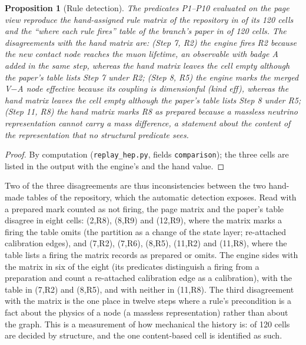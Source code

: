 \documentclass[11pt,a4paper,twoside,openany]{report}
\theoremstyle{plain}
\newtheorem{proposition}[theorem]{Proposition}
\theoremstyle{definition}
\theoremstyle{remark}
\begin{document}
\begin{proposition}[Rule detection]\label{prop:detection}
The predicates P1--P10 evaluated on the page view reproduce the hand-assigned rule matrix of the repository in \NhepAgree{} of its 120 cells and the ``where each rule fires'' table of the branch's paper in \NhepPaperAgree{} of 120 cells. The \NhepDisagree{} disagreements with the hand matrix are: (Step 7, R2) the engine fires R2 because the new contact node reaches the muon lifetime, an observable with badge A added in the same step, whereas the hand matrix leaves the cell empty although the paper's table lists Step 7 under R2; (Step 8, R5) the engine marks the merged V$-$A node effective because its coupling is dimensionful (kind \emph{eff}), whereas the hand matrix leaves the cell empty although the paper's table lists Step 8 under R5; (Step 11, R8) the hand matrix marks R8 as prepared because a massless neutrino representation cannot carry a mass difference, a statement about the content of the representation that no structural predicate sees.
\end{proposition}
\begin{proof}
By computation (\texttt{replay\_hep.py}, fields \texttt{comparison}); the three cells are listed in the output with the engine's and the hand value.
\end{proof}
Two of the three disagreements are thus inconsistencies between the two hand-made tables of the repository, which the automatic detection exposes. Read with a prepared mark counted as not firing, the page matrix and the paper's table disagree in eight cells: (2,R8), (8,R9) and (12,R9), where the matrix marks a firing the table omits (the partition as a change of the state layer; re-attached calibration edges), and (7,R2), (7,R6), (8,R5), (11,R2) and (11,R8), where the table lists a firing the matrix records as prepared or omits. The engine sides with the matrix in six of the eight (its predicates distinguish a firing from a preparation and count a re-attached calibration edge as a calibration), with the table in (7,R2) and (8,R5), and with neither in (11,R8). The third disagreement with the matrix is the one place in twelve steps where a rule's precondition is a fact about the physics of a node (a massless representation) rather than about the graph. This is a measurement of how mechanical the history is: \NhepAgree{} of 120 cells are decided by structure, and the one content-based cell is identified as such.
\end{document}
